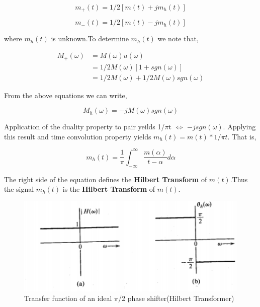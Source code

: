 \begin{equation}
	m_+(t)=1/2[m(t)+jm_h(t)]	
\end{equation}
 
\begin{equation}
m_-(t)=1/2[m(t)-jm_h(t)]	
\end{equation}

where $m_h(t)$ is unknown.To determine $m_h(t)$ we note that,

\begin{equation}
\begin{split}
 M_+(\omega) & =M(\omega)u(\omega) \\
  &=1/2 M(\omega)[1+sgn(\omega)] \\
  &=1/2 M(\omega)+1/2 M(\omega)sgn(\omega)
\end{split}
\end{equation}

From the above equations we can write,

\begin{equation}
	M_h(\omega)=-jM(\omega)sgn(\omega)
\end{equation}
 
Application of the duality property to pair yeilds 1/$\pi$t $\Longleftrightarrow$ $-jsgn(\omega)$. Applying this result and time convolution property yields $m_h(t)=m(t)*1/\pi t$. That is,

\begin{equation}
	m_h(t)=\frac{1}{\pi} \int_{-\infty}^{\infty} \frac{m(\alpha)}{t-\alpha} d\alpha
\end{equation}

The right side of the equation defines the \textbf{Hilbert Transform} of $m(t)$.Thus the signal $m_h(t)$ is the \textbf{Hilbert Transform} of $m(t)$.

\begin{figure}[H]
	\centering
	\includegraphics[]{Capture2.PNG}
	\caption{Transfer function of an ideal $\pi$/2 phase shifter(Hilbert Transformer)}
\end{figure}

